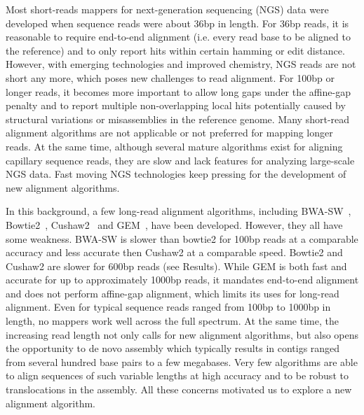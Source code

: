 \documentclass{bioinfo}
\begin{document}
Most short-reads mappers for next-generation sequencing (NGS) data were
developed when sequence reads were about 36bp in length. For 36bp reads, it is
reasonable to require end-to-end alignment (i.e. every read base to be aligned
to the reference) and to only report hits within certain hamming or edit
distance.  However, with emerging technologies and improved chemistry, NGS
reads are not short any more, which poses new challenges to read alignment. For
100bp or longer reads, it becomes more important to allow long gaps under the affine-gap
penalty and to report multiple non-overlapping local hits potentially caused by
structural variations or misassemblies in the reference genome. Many short-read
alignment algorithms are not applicable or not preferred for mapping longer
reads. At the same time, although several mature algorithms exist for aligning
capillary sequence reads, they are slow and lack features for analyzing
large-scale NGS data. Fast moving NGS technologies keep pressing for the
development of new alignment algorithms.

In this background, a few long-read alignment algorithms, including
BWA-SW~\citep{Li:2010fk}, Bowtie2~\citep{Langmead:2012fk},
Cushaw2~\citep{Liu:2012uq} and GEM~\citep{Marco-Sola:2012kx}, have been
developed. However, they all have some weakness. BWA-SW is slower than bowtie2
for 100bp reads at a comparable accuracy and less accurate then Cushaw2 at a
comparable speed. Bowtie2 and Cushaw2 are slower for 600bp reads (see Results).
While GEM is both fast and accurate for up to approximately 1000bp reads, it
mandates end-to-end alignment and does not perform affine-gap alignment, which
limits its uses for long-read alignment. Even for typical sequence reads ranged
from 100bp to 1000bp in length, no mappers work well across the full spectrum.
At the same time, the increasing read length not only calls for new alignment
algorithms, but also opens the opportunity to de novo assembly which typically
results in contigs ranged from several hundred base pairs to a few megabases.
Very few algorithms are able to align sequences of such variable lengths
at high accuracy and to be robust to translocations in the assembly. All these
concerns motivated us to explore a new alignment algorithm.
\end{document}
